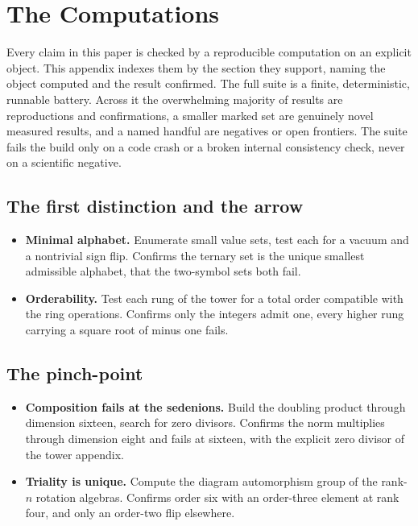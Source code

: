 \section{The Computations}

Every claim in this paper is checked by a reproducible computation on an explicit object. This appendix indexes them by the section they support, naming the object computed and the result confirmed. The full suite is a finite, deterministic, runnable battery. Across it the overwhelming majority of results are reproductions and confirmations, a smaller marked set are genuinely novel measured results, and a named handful are negatives or open frontiers. The suite fails the build only on a code crash or a broken internal consistency check, never on a scientific negative.

\subsection*{The first distinction and the arrow}

\begin{itemize}
\item \textbf{Minimal alphabet.} Enumerate small value sets, test each for a vacuum and a nontrivial sign flip. Confirms the ternary set is the unique smallest admissible alphabet, that the two-symbol sets both fail.
\item \textbf{Orderability.} Test each rung of the tower for a total order compatible with the ring operations. Confirms only the integers admit one, every higher rung carrying a square root of minus one fails.
\end{itemize}

\subsection*{The pinch-point}

\begin{itemize}
\item \textbf{Composition fails at the sedenions.} Build the doubling product through dimension sixteen, search for zero divisors. Confirms the norm multiplies through dimension eight and fails at sixteen, with the explicit zero divisor of the tower appendix.
\item \textbf{Triality is unique.} Compute the diagram automorphism group of the rank-$n$ rotation algebras. Confirms order six with an order-three element at rank four, and only an order-two flip elsewhere.
\end{itemize}

